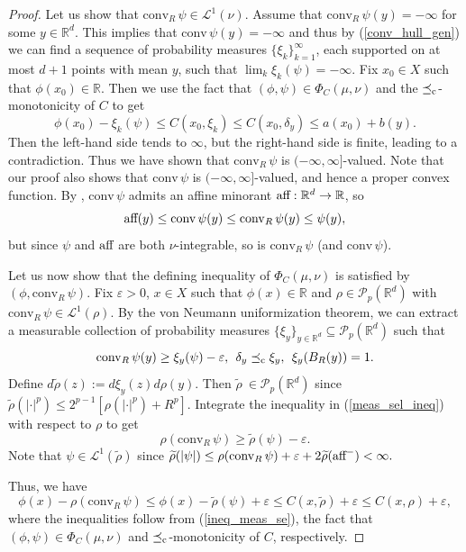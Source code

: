 \documentclass[reqno, a4paper]{amsart}
\newcommand{\lc}{\preceq_{\textnormal{c}}}
\newcommand{\conv}{\mathrm{conv}\,}
\newcommand{\convr}{\mathrm{conv}_R\,}
\newcommand{\cP}{\mathcal{P}}
\renewcommand{\P}{\cP}
\newcommand{\R}{\mathbb R}
\theoremstyle{definition}
\theoremstyle{definition}
\theoremstyle{definition}
\begin{document}
\begin{proof}
Let us show that $\convr\psi \in \mathcal L^1(\nu)$. Assume that $\convr\psi(y)=-\infty$ for some $y\in \R^d$. This implies that $\conv\psi(y)=-\infty$ and thus by (\ref{conv_hull_gen}) we can find a sequence of probability measures $\{\xi_k\}_{k=1}^\infty$, each supported on at most $d+1$ points with mean $y$, such that $\lim_k \xi_k(\psi)=-\infty$. Fix $x_0\in X$ such that $\phi(x_0)\in\R$. Then we use the fact that $(\phi,\psi)\in\Phi_C(\mu,\nu)$ and the $\lc$-monotonicity of $C$ to get
$$\phi(x_0)-\xi_k(\psi)\leq C(x_0,\xi_k)\leq C(x_0,\delta_y)\leq a(x_0)+b(y).$$
Then the left-hand side tends to $\infty$, but the right-hand side is finite, leading to a contradiction. Thus we have shown that $\convr\psi$ is $(-\infty,\infty]$-valued. Note that our proof also shows that $\conv\psi$ is $(-\infty,\infty]$-valued, and hence a proper convex function. By \cite[Corollary 12.1.2]{rockafellar1997convex}, $\conv \psi$ admits an affine minorant  $\textnormal{aff}:\R^d\to\mathbb R$, so
$$\textnormal{aff}(y)\leq\conv\psi(y)\leq \convr\psi(y)\leq\psi(y),$$
but since $\psi$ and $\textnormal{aff}$ are both $\nu$-integrable, so is $\convr\psi$ (and $\conv \psi$).

Let us now show that the defining inequality of $\Phi_C(\mu,\nu)$ is satisfied by $(\phi,\convr\psi)$. Fix $\varepsilon>0$, $x\in X$ such that $\phi(x)\in\R$ and $\rho \in \P_p(\R^d)$ with $\convr\psi \in \mathcal L^1(\rho)$. By the von Neumann uniformization theorem, we can extract a measurable collection of probability measures $\{\xi_y\}_{y\in\R^d}\subseteq\P_p(\R^d)$ such that \begin{equation}
    \label{meas_sel_ineq}\convr\psi(y)\geq\xi_y(\psi)-\varepsilon, \;\, \delta_y\lc\xi_y, \;\,\xi_y(B_R(y))=1.
\end{equation}
Define $d\widetilde{\rho}(z):=d\xi_y(z) d\rho(y).$ Then $\widetilde{\rho}\ \in \P_p(\R^d)$ since $\widetilde{\rho}(|\cdot|^p)\leq2^{p-1}[{\rho}(|\cdot|^p)+R^p]$. Integrate the inequality in (\ref{meas_sel_ineq}) with respect to $\rho$ to get 
\begin{equation}
\label{ineq_meas_se}
\rho(\convr\psi)\geq\widetilde\rho(\psi)- \varepsilon.
\end{equation}
Note that $\psi\in\mathcal L^1(\widetilde\rho)$ since $\widetilde{\rho}(|\psi|)\leq \rho(\convr\psi)+\varepsilon+2\widetilde{\rho}(\textnormal{aff}^-)<\infty.$ 

Thus, we have
$$\phi(x)-\rho(\convr\psi)\leq \phi(x)-\widetilde\rho(\psi)+\varepsilon\leq C(x,\widetilde{\rho})+\varepsilon\leq C(x,\rho)+\varepsilon,$$
where the inequalities follow from (\ref{ineq_meas_se}), the fact that $(\phi,\psi)\in \Phi_C(\mu,\nu)$ and $\lc$-monotonicity of $C$, respectively. 


\end{proof}
\end{document}
